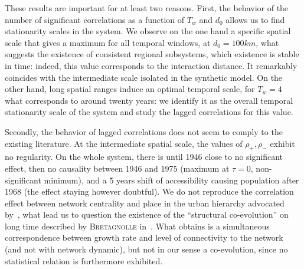 \documentclass[11pt]{article}
\newcommand{\noun}[1]{\textsc{#1}}
\begin{document}
These results are important for at least two reasons. First, the behavior of the number of significant correlations as a function of $T_w$ and $d_0$ allows us to find stationarity scales in the system. We observe on the one hand a specific spatial scale that gives a maximum for all temporal windows, at $d_0 = 100km$, what suggests the existence of consistent regional subsystems, which existence is stable in time: indeed, this value corresponds to the interaction distance. It remarkably coincides with the intermediate scale isolated in the synthetic model. On the other hand, long spatial ranges induce an optimal temporal scale, for $T_w = 4$ what corresponds to around twenty years: we identify it as the overall temporal stationarity scale of the system and study the lagged correlations for this value.



Secondly, the behavior of lagged correlations does not seem to comply to the existing literature. At the intermediate spatial scale, the values of $\rho_+,\rho_-$ exhibit no regularity. On the whole system, there is until 1946 close to no significant effect, then no causality between 1946 and 1975 (maximum at $\tau = 0$, non-significant minimum), and a 5 years shift of accessibility causing population after 1968 (the effect staying however doubtful). We do not reproduce the correlation effect between network centrality and place in the urban hierarchy advocated by~\cite{bretagnolle2003vitesse}, what lead us to question the existence of the ``structural co-evolution'' on long time described by \noun{Bretagnolle} in~\citep{espacegeo2014effets}. What \cite{bretagnolle2003vitesse} obtains is a simultaneous correspondence between growth rate and level of connectivity to the network (and not with network dynamic), but not in our sense a co-evolution, since no statistical relation is furthermore exhibited.

\end{document}
